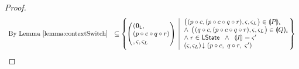 \begin{lemma}[\forgetRule]
\begin{proof}
\[\begin{array}{r l}
	\text{By Lemma \ref{lemma:contextSwitch}} & 
	\subseteq \left\{
	\hspace*{-0.2cm}
	\begin{array}{l | l}
		\left(
		\hspace*{-0.15cm}
		\begin{array}{l}
		(\unitL, \\
		(p \composeL c \composeL q \composeL r)\\
		, \amod{}, \amod{L}
		\end{array}
		\hspace*{-0.15cm}
		\right)
		&
		\hspace*{-0.1cm}
		\begin{array}{l}
			\left(
			\hspace*{-0.15cm}
			\begin{array}{l}
			(p \composeL c, 
			(p \composeL c \composeL q \composeL r)
			, \amod{}, \amod{L}
			\end{array}
			\hspace*{-0.15cm}
			\right) \in \intermediateSem[\lenv]{P}\\
			
			\land\; \left(
			\hspace*{-0.15cm}
			\begin{array}{l}
			(q \composeL c, 
			(p \composeL c \composeL q \composeL r)
			, \amod{}, \amod{L}
			\end{array}
			\hspace*{-0.15cm}
			\right) \in \intermediateSem[\lenv]{Q}\\
			
			\land\; r \in \LStates \;\;\land\;\; \intermediateSemI{I} = \amod{}'\\
			
			\extendsAM{\amod{}, \amod{L}}{p \composeL c}{\ q \composeL r}{\ \amod{}'}
		\end{array}
		\hspace*{-0.1cm}
	\end{array}
	\hspace*{-0.2cm}
	\right\} \\
	
	
	
	
	

\end{array}\]
\end{proof}
\end{lemma}
